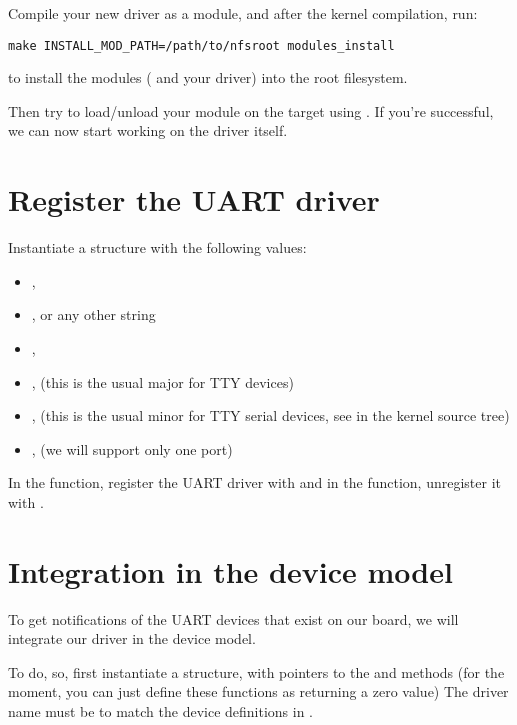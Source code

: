 Compile your new driver as a module, and after the kernel compilation, run:

\begin{verbatim}
make INSTALL_MOD_PATH=/path/to/nfsroot modules_install
\end{verbatim}

to install the modules ( and your driver) into the
root filesystem.

Then try to load/unload your module on the target
using . If you're successful, we can now start working
on the driver itself.

\section{Register the UART driver}

Instantiate a  structure with the following values:

\begin{itemize}
\item {}, 
\item {},  or any other string
\item {}, 
\item {},  (this is the usual major for TTY devices)
\item {},  (this is the usual minor for TTY serial
  devices, see  in the kernel source tree)
\item {},  (we will support only one port)
\end{itemize}

In the  function, register the UART driver with
 and in the  function,
unregister it with .

\section{Integration in the device model}

To get notifications of the UART devices that exist on our board, we
will integrate our driver in the device model.

To do, so, first instantiate a  structure, with
pointers to the  and  methods (for the 
moment, you can just define these functions as returning a zero value)
The driver name must be  to match the device definitions in
.

